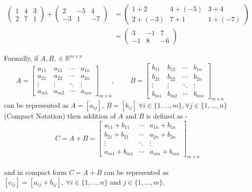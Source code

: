 \documentclass{article}
\begin{document}
\begin{align}
    \begin{pmatrix}
        1 & 4 & 3 \\
        2 & 7 & 1
    \end{pmatrix} + \begin{pmatrix}
                        2 & -5 & 4 \\
                        -3 & 1 & -7
                    \end{pmatrix} &= \begin{pmatrix}
                                        1+2 & 4+(-5) & 3+4 \\
                                        2+(-3)& 7+1 & 1+(-7)
                                     \end{pmatrix}\nonumber \\
                                  &= \begin{pmatrix}
                                        3 & -1 & 7\\
                                        -1 & 8 & -6
                                     \end{pmatrix} \nonumber
\end{align}

Formally, if \(A, B, \in \mathbb{R}^{m\times n}\) \\

\(
 ~~~~~~~~A = \begin{bmatrix}
        a_{11} & a_{12} & \cdots & a_{1n} \\
         a_{21} & a_{22} & \cdots & a_{2n}\\
        \vdots  & \vdots  & \ddots & \vdots\\
        a_{m1} & a_{m2} & \cdots & a_{mn}
     \end{bmatrix}_{m\times n}, ~~~~~~~~~~
B = \begin{bmatrix}
        b_{11} & b_{12} & \cdots & b_{1n} \\
         b_{21} & b_{22} & \cdots & b_{2n}\\
        \vdots  & \vdots  & \ddots & \vdots\\
        b_{m1} & b_{m2} & \cdots & b_{mn}
     \end{bmatrix}_{m\times n}
\)\\


can be represented as \(A = [a_{ij}],~ B = [b_{ij}]~ \forall i \in \{1,...,m\},\forall j \in \{1,...,n\}\) (Compact Notation) then addition of \(A\) and \(B\) is defined as -\\
\[
C = A + B = \begin{bmatrix}
        a_{11} + b_{11} & \cdots & a_{1n} + b_{1n} \\
        b_{21} + b_{21} &  \cdots & a_{2n} + b_{2n}\\
        \vdots    & \ddots & \vdots\\
       a_{m1} + b_{m1}  & \cdots & a_{mn} + b_{mn}
     \end{bmatrix}_{m\times n}
\]\\
and in compact form \(C = A + B\) can be represented as \([c_{ij}]=[a_{ij} + b_{ij}],~\forall i \in \{1,...,n\}\) and \(j \in \{1,...,m\}\).
\end{document}
